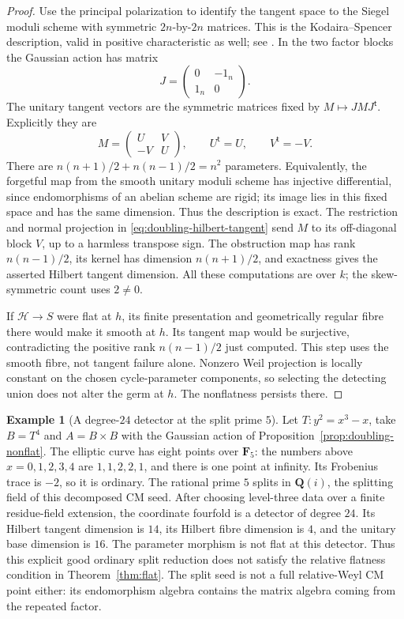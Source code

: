 \documentclass[11pt]{article}
\theoremstyle{definition}
\newtheorem{example}[theorem]{Example}
\theoremstyle{remark}
\newcommand{\Q}{\mathbf Q}
\begin{document}
\begin{proof}
Use the principal polarization to identify the tangent space
to the Siegel moduli scheme with symmetric $2n$-by-$2n$
matrices.  This is the Kodaira--Spencer description, valid in
positive characteristic as well; see
\cite[Lemma~12(1), pp.~165--166; \S IV.6,
pp.~178--181]{KoblitzDeformation}.
In the two factor blocks the Gaussian action has matrix
\[
 J=\begin{pmatrix}0&-1_n\\1_n&0\end{pmatrix}.
\]
The unitary tangent vectors are the symmetric matrices fixed
by $M\mapsto JMJ^{\mathsf t}$.  Explicitly they are
\[
 M=\begin{pmatrix}U&V\\-V&U\end{pmatrix},
 \qquad U^{\mathsf t}=U,\qquad V^{\mathsf t}=-V.
\]
There are $n(n+1)/2+n(n-1)/2=n^2$ parameters.
Equivalently, the forgetful map from the smooth unitary moduli
scheme has injective differential, since endomorphisms of an
abelian scheme are rigid; its image lies in this fixed space
and has the same dimension.  Thus the description is exact.
The restriction and normal projection in
\eqref{eq:doubling-hilbert-tangent} send $M$ to its off-diagonal
block $V$, up to a harmless transpose sign.  The obstruction
map has rank $n(n-1)/2$, its kernel has dimension $n(n+1)/2$,
and exactness gives the asserted Hilbert tangent dimension.
All these computations are over $k$; the skew-symmetric count
uses $2\ne0$.

If $\mathscr H\to S$ were flat at $h$, its finite presentation
and geometrically regular fibre there would make it smooth at
$h$.  Its tangent map would be surjective, contradicting the
positive rank $n(n-1)/2$ just computed.  This step uses the
smooth fibre, not tangent failure alone.  Nonzero Weil
projection is locally constant on the chosen cycle-parameter
components, so selecting the detecting union does not alter
the germ at $h$.  The nonflatness persists there.
\end{proof}

\begin{example}[A degree-$24$ detector at the split prime $5$]
\label{ex:doubling-prime-five}
Let $T:y^2=x^3-x$, take $B=T^4$ and $A=B\times B$ with the
Gaussian action of Proposition~\ref{prop:doubling-nonflat}.
The elliptic curve has eight points over $\mathbf F_5$:
the numbers above $x=0,1,2,3,4$ are $1,1,2,2,1$, and there
is one point at infinity.  Its Frobenius trace is $-2$, so it
is ordinary.  The rational prime $5$ splits in $\Q(i)$, the
splitting field of this decomposed CM seed.  After choosing
level-three data over a finite residue-field extension, the
coordinate fourfold is a detector of degree $24$.
Its Hilbert tangent dimension is $14$, its Hilbert fibre
dimension is $4$, and the unitary base dimension is $16$.
The parameter morphism is not flat at this detector.  Thus this
explicit good ordinary split reduction does not satisfy the
relative flatness condition in Theorem~\ref{thm:flat}.
The split seed is not a full relative-Weyl CM point either:
its endomorphism algebra contains the matrix algebra coming
from the repeated factor.
\end{example}
\end{document}
